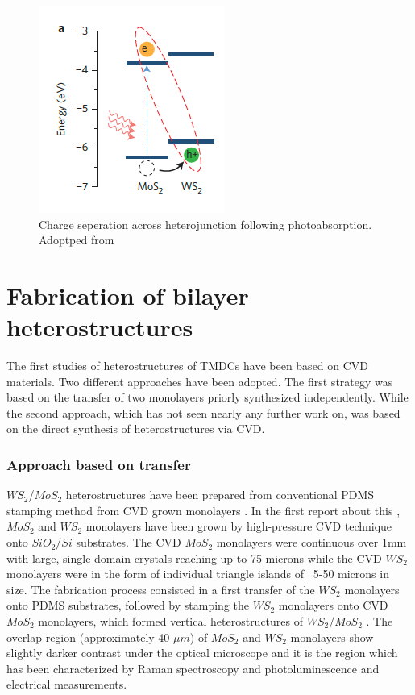 \begin{figure}[h]
	\begin{center}
		\includegraphics[scale=1]{Heterostructures/HeterostructureChargeSeparationDiagram.png}
		\caption{Charge seperation across heterojunction following photoabsorption. Adoptped from \cite{Hong2014}}
		\label{fig:HeterostructuresChargeSeperationDiagram}
	\end{center}
\end{figure}

\section{Fabrication of bilayer heterostructures}

The first studies of heterostructures of TMDCs have been based on CVD materials. Two different approaches have been adopted. The first strategy was based on the transfer of two monolayers priorly synthesized independently. While the second approach, which has not seen nearly any further work on, was based on the direct synthesis of heterostructures via CVD. 

\subsubsection{Approach based on transfer}

$WS_2$/$MoS_2$ heterostructures have been prepared from conventional PDMS stamping method from CVD grown monolayers \cite{Tongay2014}. In the first report about this \cite{Gong2014}, $MoS_2$ and $WS_2$ monolayers have been grown by high-pressure CVD technique onto $SiO_2/Si$ substrates. The CVD $MoS_2$ monolayers were continuous over 1mm with large, single-domain crystals reaching up to 75 microns while the CVD $WS_2$ monolayers were in the form of individual triangle islands of ~5-50 microns in size. 
The fabrication process consisted in a first transfer of the $WS_2$ monolayers onto PDMS substrates, followed by stamping the $WS_2$ monolayers onto CVD $MoS_2$ monolayers, which formed vertical heterostructures of $WS_2$/$MoS_2$ \cite{Tongay2014}. The overlap region (approximately 40 ${\mu}m$) of $MoS_2$ and $WS_2$ monolayers show slightly darker contrast under the optical microscope and it is the region which has been characterized by Raman spectroscopy and photoluminescence and electrical measurements.


